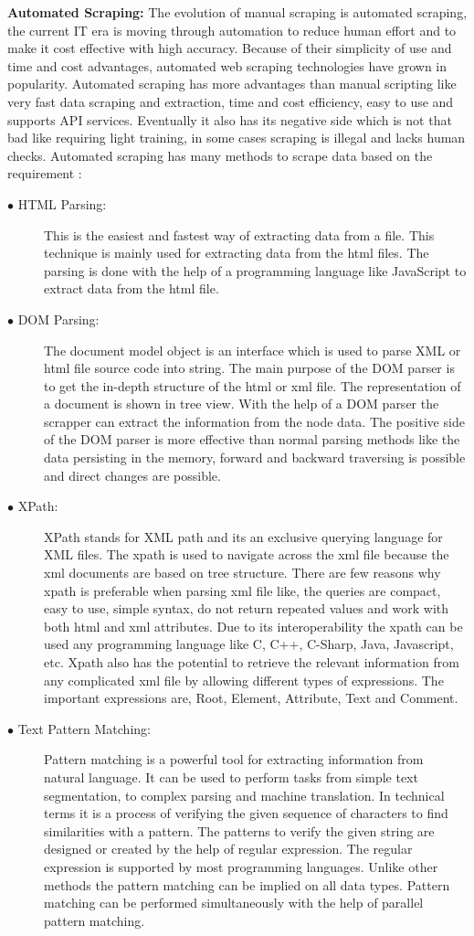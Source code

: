 {\bf Automated  Scraping:} The evolution of manual scraping is automated scraping, the current IT era is moving through automation to reduce human effort  and to make it cost effective with high accuracy. Because of their simplicity of use and time and cost advantages, automated web scraping technologies have grown in popularity. Automated scraping has more advantages than manual scripting like very fast data scraping and extraction, time and cost efficiency, easy to use and supports API services. Eventually it also has its negative side which is not that bad like requiring light training, in some cases scraping is illegal and lacks human checks. Automated scraping has many methods to scrape data based on the requirement \cite{Radware}:
\begin{description}
	\item [$\bullet$ HTML Parsing:] This is the easiest and fastest way of extracting data from a file. This technique is mainly used for extracting data from the html files. The parsing is done with the help of a programming language like JavaScript to extract data from the html file. 
	
	\item [$\bullet$ DOM Parsing:] The document model object is an interface which is used to parse XML or html file source code into string. The main purpose of the DOM parser is to get the in-depth structure of the html or xml file. The representation of a document is shown in tree view. With the help of a DOM parser the scrapper can extract the information from the node data. The positive side of the DOM parser is more effective than normal parsing methods like the data persisting in the memory, forward and backward traversing is possible and direct changes are possible.
	\item [$\bullet$ XPath:] XPath stands for XML path and its an exclusive querying language for XML files. The xpath is used to navigate across the xml file because the xml documents are based on tree structure. There are few reasons why xpath is preferable when parsing xml file like, the queries are compact, easy to use, simple syntax, do not return repeated values and work with both html and xml attributes. Due to its interoperability the xpath can be used any programming language like C, C++, C-Sharp, Java, Javascript, etc. Xpath also has the potential to retrieve the relevant information from any complicated xml file by allowing different types of expressions. The important expressions are, Root, Element, Attribute, Text and Comment.
	\item [$\bullet$ Text Pattern Matching:] Pattern matching is a powerful tool for extracting information from natural language. It can be used to perform tasks from simple text segmentation, to complex parsing and machine translation. In technical terms it is a process of verifying the given sequence of characters to find similarities with a pattern. The patterns to verify the given string are designed or created by the help of regular expression. The regular expression is supported by most programming languages. Unlike other methods the pattern matching can be implied on all data types. Pattern matching can be performed simultaneously with the help of parallel pattern matching. 
\end{description}
